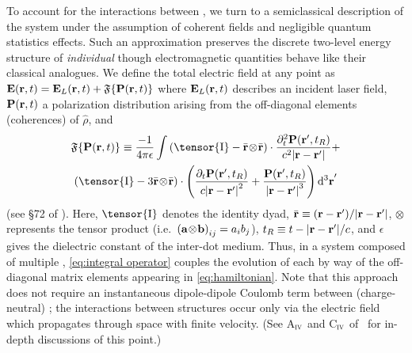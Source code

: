 To account for the interactions between \qds{}, we turn to a semiclassical description of the system under the assumption of coherent fields and negligible quantum  statistics effects.
Such an approximation preserves the discrete two-level energy structure of \emph{individual} \qds{} though electromagnetic quantities behave like their classical analogues.
We define the total electric field at any point as $\vb{E}(\vb{r}, t) = \vb{E}_L(\vb{r}, t) + \mathfrak{F}\{ \vb{P}(\vb{r}, t) \}$
where $\vb{E}_L(\vb{r}, t)$ describes an incident laser field, $\vb{P}(\vb{r}, t)$ a polarization distribution arising from  the off-diagonal elements (coherences) of $\hat{\rho}$, and
\begin{equation}
  \begin{gathered}
    \mathfrak{F}\{\vb{P}(\vb{r}, t)\} \equiv
      \frac{-1}{4\pi \epsilon} \int
      \left(\tensor{\mathrm{I}} -  \outerprod{\bar{\vb{r}}}{\bar{\vb{r}}} \right) \cdot \frac{\partial_t^2 \vb{P}(\vb{r}', t_R)}{c^2 \abs{\vb{r}-\vb{r}'}} + \\
      \left(\tensor{\mathrm{I}} - 3\outerprod{\bar{\vb{r}}}{\bar{\vb{r}}} \right) \cdot \qty(
        \frac{\partial_t   \vb{P}(\vb{r}', t_R)}{c \abs{\vb{r}-\vb{r}'}^2} +
        \frac{             \vb{P}(\vb{r}', t_R)}{  \abs{\vb{r}-\vb{r}'}^3}
      ) \dd[3]{\vb{r}}'
  \end{gathered}
  \label{eq:integral operator}
\end{equation}
(see \S 72 of \cite{Landau2013}).
Here, $\tensor{\mathrm{I}}$ denotes the identity dyad, $\bar{\vb{r}} \equiv \qty(\vb{r} - \vb{r}')/\abs{\vb{r} - \vb{r}'}$, $\otimes$ represents the tensor product (i.e.\ $\qty(\vb{a} \! \otimes \! \vb{b})_{ij} = a_i b_j$), $t_R \equiv t - \abs{\vb{r} - \vb{r}'}/c$, and $\epsilon$ gives the dielectric constant of the inter-dot medium.
Thus, in a system composed of multiple \qds{}, \cref{eq:integral operator} couples the evolution of each \qd{} by way of the off-diagonal matrix elements appearing in \cref{eq:hamiltonian}.
Note that this approach does not require an instantaneous dipole-dipole Coulomb term between (charge-neutral) \qds{}; the interactions between structures occur only via the electric field which propagates through space with finite velocity.
(See {A}$_{\textsc{iv}}$  and {C}$_{\textsc{iv}}$ of~\cite{Cohen1989} for in-depth discussions of this point.)


